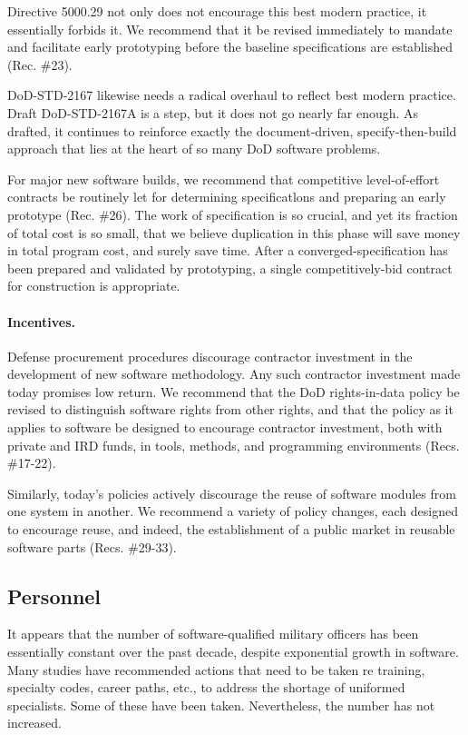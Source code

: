 \documentclass[11pt,final]{article}
\begin{document}
Directive 5000.29 not only does not encourage this best modern practice, it
essentially forbids it. We recommend that it be revised immediately to mandate
and facilitate early prototyping before the baseline specifications are
established (Rec. \#23).

DoD-STD-2167 likewise needs a radical overhaul to reflect best modern practice.
Draft DoD-STD-2167A is a step, but it does not go nearly far enough. As
drafted, it continues to reinforce exactly the document-driven,
specify-then-build approach that lies at the heart of so many DoD software
problems.

For major new software builds, we recommend that competitive level-of-effort
contracts be routinely let for determining specificatlons and preparing an
early prototype (Rec. \#26). The work of specification is so crucial, and yet
its fraction of total cost is so small, that we believe duplication in this
phase will save money in total program cost, and surely save time. After a
converged-specification has been prepared and validated by prototyping, a
single competitively-bid contract for construction is appropriate.

\paragraph{Incentives.} Defense procurement procedures discourage contractor
investment in the development of new software methodology. Any such contractor
investment made today promises low return. We recommend that the DoD
rights-in-data policy be revised to distinguish software rights from other
rights, and that the policy as it applies to software be designed to encourage
contractor investment, both with private and IRD funds, in tools, methods, and
programming environments (Recs. \#17-22).

Similarly, today’s policies actively discourage the reuse of software modules
from one system in another. We recommend a variety of policy changes, each
designed to encourage reuse, and indeed, the establishment of a public market
in reusable software parts (Recs. \#29-33).

\subsection*{Personnel}

It appears that the number of software-qualified military officers has been
essentially constant over the past decade, despite exponential growth in
software. Many studies have recommended actions that need to be taken re
training, specialty codes, career paths, etc., to address the shortage of
uniformed specialists. Some of these have been taken.  Nevertheless, the number
has not increased.
\end{document}
